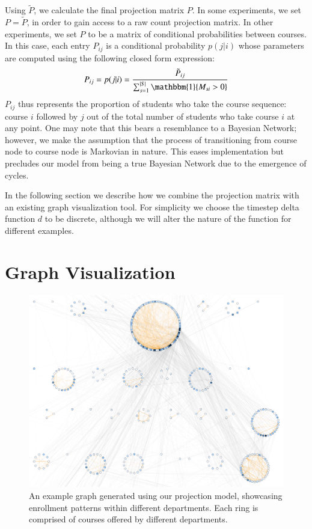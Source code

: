 \documentclass{sigchi}
\begin{document}
Using $\tilde{P}$, we calculate the final projection matrix $P$. In some experiments, we set $P = \tilde{P}$, in order to gain access to a raw count projection matrix. In other experiments, we set $P$ to be a matrix of conditional probabilities between courses. In this case, each entry $P_{ij}$ is a conditional probability $p(j|i)$ whose parameters are computed using the following closed form expression:
\begin{equation}
    P_{ij} = p(j|i) = \frac{\tilde{P}_{ij}}{\sum_{s=1}^{|S|}\mathbbm{1}\{M_{si} > 0\}}
\end{equation}
$P_{ij}$ thus represents the proportion of students who take the
course sequence: course $i$ followed by $j$ out of the total number of
students who take course $i$ at any point. One may note that this
bears a resemblance to a Bayesian Network; however, we make the
assumption that the process of transitioning from course node to
course node is Markovian in nature. This eases implementation but
precludes our model from being a true Bayesian Network due to the
emergence of cycles.

In the following section we describe how we combine the projection
matrix with an existing graph visualization tool. For simplicity we
choose the timestep delta function $d$ to be discrete, although we
will alter the nature of the function for different examples.

\section{Graph Visualization}
\label{sec:visualization}

\begin{figure}
    \centering
    \includegraphics[width=\columnwidth]{Figs/final-overview.pdf}
    \caption{An example graph generated using our projection model,
      showcasing enrollment patterns within different departments. Each ring is comprised of courses offered by different departments.}
    \label{fig:overview}
\end{figure}
\end{document}
